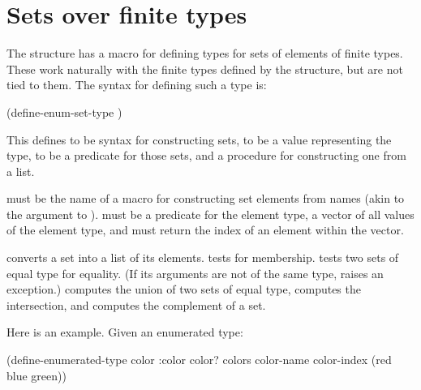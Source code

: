 \section{Sets over finite types}
\label{sets-finite-types}

The structure  has a macro for defining types for sets
of elements of finite types.  These work naturally with the finite
types defined by the  structure, but are not tied
to them.  The syntax for defining such a type is:

\begin{example}
(define-enum-set-type    
      )
\end{example}
%
This defines  to be syntax for constructing sets,
 to be a value representing the type,
 to be a predicate for those sets, and
 a procedure for constructing one from a list.

 must be the name of a macro for constructing set
elements from names (akin to the  argument to
).   must be a
predicate for the element type,  a vector of all
values of the element type, and  must return
the index of an element within the  vector.

\begin{protos}
\end{protos}
%
 converts a set into a list of its elements.
 tests for membership.   tests
two sets of equal type for equality.  (If its arguments are not of the
same type,  raises an exception.)
 computes the union of two sets of equal type,
 computes the intersection, and
 computes the complement of a set.

Here is an example.  Given an enumerated type:

\begin{example}
(define-enumerated-type color :color
  color?
  colors
  color-name
  color-index
  (red blue green))
\end{example}

